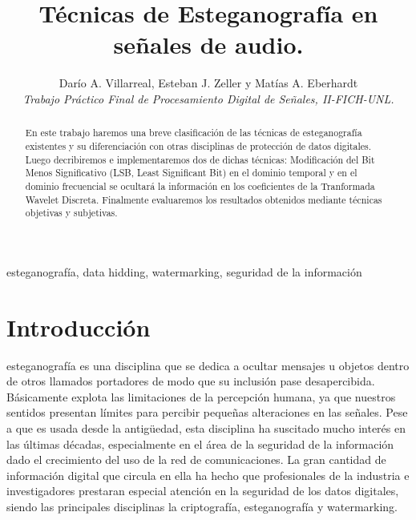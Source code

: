 \documentclass[conference,a4paper,10pt, oneside,final]{tfmpd}
\begin{document}
\title{Técnicas de Esteganografía en señales de audio.}

\author{Darío A. Villarreal,
        Esteban J. Zeller y
        Matías A. Eberhardt\\
\textit{Trabajo Práctico Final de Procesamiento Digital de Señales, II-FICH-UNL.}}


\maketitle

\begin{abstract}
En este trabajo haremos una breve clasificación de las técnicas de esteganografía existentes y su diferenciación con otras disciplinas de protección de datos digitales. Luego decribiremos e implementaremos dos de dichas técnicas: Modificación del Bit Menos Significativo (LSB, Least Significant Bit) en el dominio temporal y en el dominio frecuencial se ocultará la información en los coeficientes de la Tranformada Wavelet Discreta. Finalmente evaluaremos los resultados obtenidos mediante técnicas objetivas y subjetivas.
\end{abstract}

\begin{keywords}
esteganografía, data hidding, watermarking, seguridad de la información
\end{keywords}

\section{Introducción}
 esteganografía es una disciplina que se dedica a ocultar mensajes u objetos dentro de otros llamados portadores de modo que su inclusión pase desapercibida. Básicamente explota las limitaciones de la percepción humana, ya que nuestros sentidos presentan límites para percibir pequeñas alteraciones en las señales.
Pese a que es usada desde la antigüedad, esta disciplina ha suscitado mucho interés en las últimas décadas, especialmente en el área de la seguridad de la información dado el crecimiento del uso de la red de comunicaciones. La gran cantidad de información digital que circula en ella ha hecho que profesionales de la industria e investigadores prestaran especial atención en la seguridad de los datos digitales, siendo las principales disciplinas la criptografía, esteganografía y watermarking. 
\end{document}
